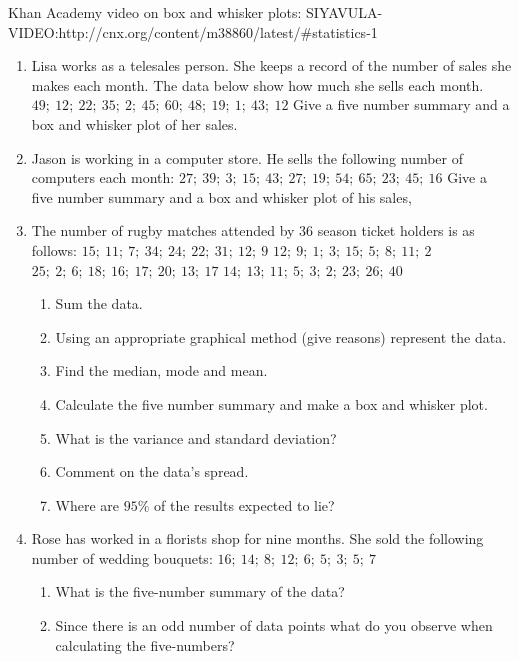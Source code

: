 Khan Academy video on box and whisker plots: SIYAVULA-VIDEO:http://cnx.org/content/m38860/latest/#statistics-1
{
\begin{enumerate}
\item Lisa works as a telesales person. She keeps a record of the number of sales she makes each month. The data below show how much she sells each month. \newline
\textbf{$49; ~12; ~22; ~35; ~2; ~45;~ 60; ~48; ~19; ~1;~ 43; ~12$} \newline
Give a five number summary and a box and whisker plot of her sales. 
\item Jason is working in a computer store. He sells the following number of computers each month: \newline
\textbf{$27; ~39; ~3; ~15; ~43; ~27; ~19; ~54; ~65; ~23; ~45; ~16$} \newline
Give a five number summary and a box and whisker plot of his sales,
\item The number of rugby matches attended by 36 season ticket holders is as follows: \newline
\textbf{$15; ~11;~ 7;~ 34;~ 24;~ 22;~ 31;~ 12;~ 9$} \newline
\textbf{$12;~ 9;~ 1;~ 3;~ 15;~ 5;~ 8;~ 11;~ 2$} \newline
\textbf{$25;~ 2;~ 6; ~18; ~16; ~17; ~20; ~13; ~17$} \newline
\textbf{$14;~ 13;~ 11; ~5; ~3; ~2; ~23; ~26; ~40$} \newline
	\begin{enumerate}
	\item Sum the data.
	\item Using an appropriate graphical method (give reasons) represent the data.
	\item Find the median, mode and mean.
	\item Calculate the five number summary and make a box and whisker plot.
	\item What is the variance and standard deviation?
	\item Comment on the data's spread.
	\item Where are $95\%$ of the results expected to lie?
	\end{enumerate}
\item Rose has worked in a florists shop for nine months. She sold the following number of wedding bouquets: \newline
\textbf{$16;~ 14;~ 8;~ 12;~ 6; ~5; ~3; ~5; ~7$} \newline
	\begin{enumerate}
	\item What is the five-number summary of the data?
	\item Since there is an odd number of data points what do you observe when calculating the five-numbers?
	\end{enumerate}
\end{enumerate}
}

